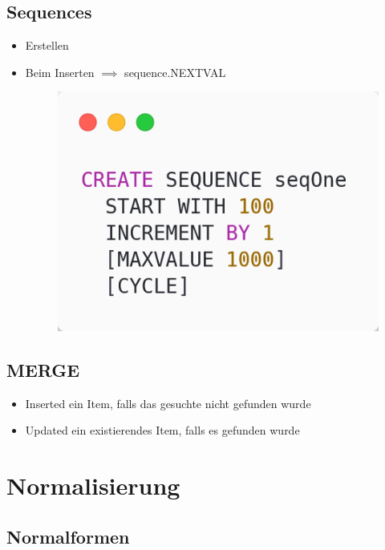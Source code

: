 \subsection{Sequences}
\begin{itemize}
    \item Erstellen
    \item Beim Inserten $\implies$ sequence.NEXTVAL
    \begin{figure}[H]
        \centering
        \includegraphics[scale=.3]{res/themenkorb_3/create_sequence.png}
    \end{figure}
\end{itemize}

\subsection{MERGE}
\begin{itemize}
    \item Inserted ein Item, falls das gesuchte nicht gefunden wurde
    \item Updated ein existierendes Item, falls es gefunden wurde
\end{itemize}

\section{Normalisierung}
\subsection{Normalformen}
